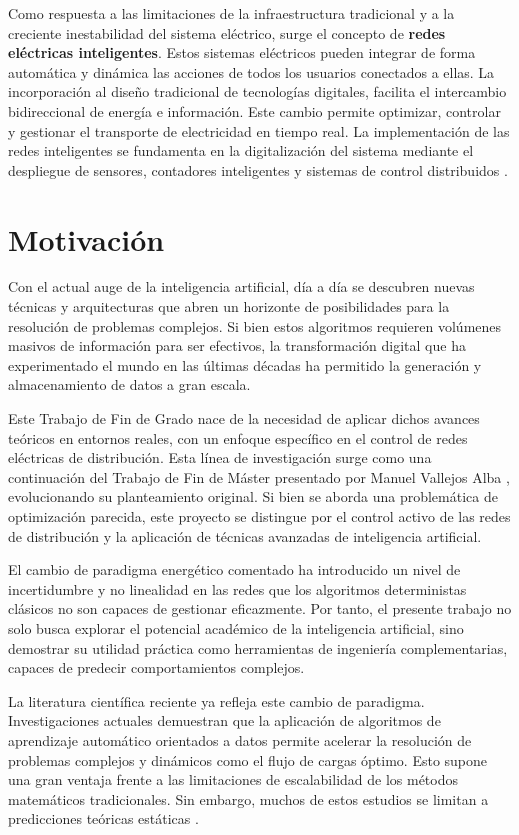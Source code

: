 Como respuesta a las limitaciones de la infraestructura tradicional y a la creciente inestabilidad del sistema eléctrico, surge el concepto de \textbf{redes eléctricas inteligentes}. Estos sistemas eléctricos pueden integrar de forma automática y dinámica las acciones de todos los usuarios conectados a ellas. La incorporación al diseño tradicional de tecnologías digitales, facilita el intercambio bidireccional de energía e información. Este cambio permite optimizar, controlar y gestionar el transporte de electricidad en tiempo real. La implementación de las redes inteligentes se fundamenta en la digitalización del sistema mediante el despliegue de sensores, contadores inteligentes y sistemas de control distribuidos \cite{smart-grids-iberdrola}.

\section{Motivación}
Con el actual auge de la inteligencia artificial, día a día se descubren nuevas técnicas y arquitecturas que abren un horizonte de posibilidades para la resolución de problemas complejos. Si bien estos algoritmos requieren volúmenes masivos de información para ser efectivos, la transformación digital que ha experimentado el mundo en las últimas décadas ha permitido la generación y almacenamiento de datos a gran escala.

Este Trabajo de Fin de Grado nace de la necesidad de aplicar dichos avances teóricos en entornos reales, con un enfoque específico en el control de redes eléctricas de distribución. Esta línea de investigación surge como una continuación del Trabajo de Fin de Máster presentado por Manuel Vallejos Alba \cite{tfm-manuel}, evolucionando su planteamiento original. Si bien se aborda una problemática de optimización parecida, este proyecto se distingue por el control activo de las redes de distribución y la aplicación de técnicas avanzadas de inteligencia artificial.

El cambio de paradigma energético comentado ha introducido un nivel de incertidumbre y no linealidad en las redes que los algoritmos deterministas clásicos no son capaces de gestionar eficazmente. Por tanto, el presente trabajo no solo busca explorar el potencial académico de la inteligencia artificial, sino demostrar su utilidad práctica como herramientas de ingeniería complementarias, capaces de predecir comportamientos complejos.

La literatura científica reciente ya refleja este cambio de paradigma. Investigaciones actuales demuestran que la aplicación de algoritmos de aprendizaje automático orientados a datos permite acelerar la resolución de problemas complejos y dinámicos como el flujo de cargas óptimo. Esto supone una gran ventaja frente a las limitaciones de escalabilidad de los métodos matemáticos tradicionales. Sin embargo, muchos de estos estudios se limitan a predicciones teóricas estáticas \cite{review-machine-learning}. 